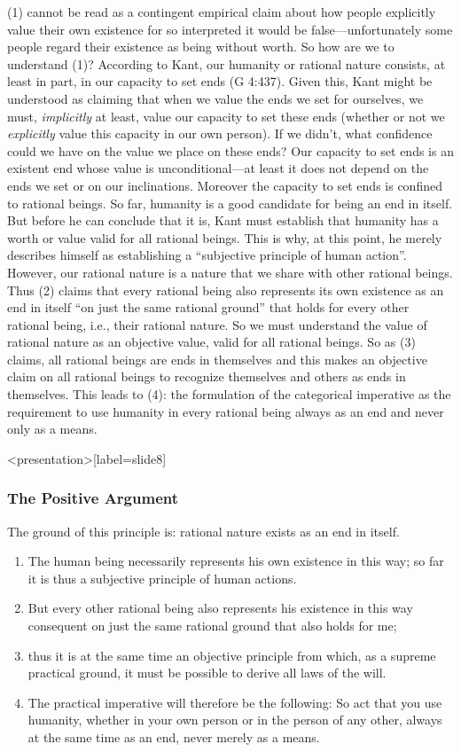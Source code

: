 (1) cannot be read as a contingent empirical claim about how people explicitly value their own existence for so interpreted it would be false---unfortunately some people regard their existence as being without worth. So how are we to understand (1)? According to Kant, our humanity or rational nature consists, at least in part, in our capacity to set ends (G 4:437). Given this, Kant might be understood as claiming that when we value the ends we set for ourselves, we must, \emph{implicitly} at least, value our capacity to set these ends (whether or not we \emph{explicitly} value this capacity in our own person). If we didn’t, what confidence could we have on the value we place on these ends? Our capacity to set ends is an existent end whose value is unconditional---at least it does not depend on the ends we set or on our inclinations. Moreover the capacity to set ends is confined to rational beings. So far, humanity is a good candidate for being an end in itself. But before he can conclude that it is, Kant must establish that humanity has a worth or value valid for all rational beings. This is why, at this point, he merely describes himself as establishing a ``subjective principle of human action''. However, our rational nature is a nature that we share with other rational beings. Thus (2) claims that every rational being also represents its own existence as an end in itself ``on just the same rational ground'' that holds for every other rational being, i.e., their rational nature. So we must understand the value of rational nature as an objective value, valid for all rational beings. So as (3) claims, all rational beings are ends in themselves and this makes an objective claim on all rational beings to recognize themselves and others as ends in themselves. This leads to (4): the formulation of the categorical imperative as the requirement to use humanity in every rational being always as an end and never only as a means. \change

\begin{frame}<presentation>[label=slide8]
    \frametitle{The Positive Argument}
        The ground of this principle is: \alert{rational nature exists as an end in itself}.
        \begin{enumerate}
            \item The human being necessarily represents his own existence in this way; so far it is thus a \alert{subjective} principle of human actions. 
            \item But every other rational being also represents his existence in this way consequent on just the same rational ground that also holds for me;
            \item thus it is at the same time an \alert{objective} principle from which, as a supreme practical ground, it must be possible to derive all laws of the will.
            \item The practical imperative will therefore be the following: \alert{So act that you use humanity, whether in your own person or in the person of any other, always at the same time as an end, never merely as a means}.
        \end{enumerate}
\end{frame}

